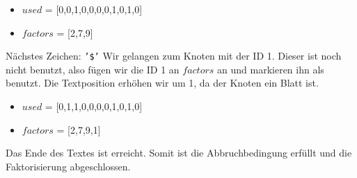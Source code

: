 \documentclass[a4paper,11pt]{scrartcl}%
\theoremstyle{change}
\theoremstyle{nonumberplain}
\theoremstyle{change}
\theoremstyle{nonumberplain}
\theoremstyle{change}
\theoremstyle{nonumberplain}
\begin{document}
\begin{itemize}
	\item $used$ = [0,0,1,0,0,0,0,1,0,1,0]
	\item $factors$ = [2,7,9]
\end{itemize}

Nächstes Zeichen: \texttt{'\$'}
Wir gelangen zum Knoten mit der ID 1. Dieser ist noch nicht benutzt, also fügen wir die ID 1 an $factors$ an und markieren ihn als benutzt. Die Textposition erhöhen wir um 1, da der Knoten ein Blatt ist.

\begin{itemize}
	\item $used$ = [0,1,1,0,0,0,0,1,0,1,0]
	\item $factors$ = [2,7,9,1]
\end{itemize}

Das Ende des Textes ist erreicht. Somit ist die Abbruchbedingung erfüllt und die Faktorisierung abgeschlossen.

\newpage
\newpage

	
\end{document}
